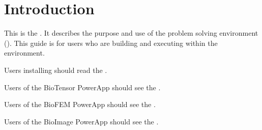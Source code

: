 %
% 
% 
% 
% 
% 
%


%

\chapter{Introduction}
\label{ch:intro}

This is the \etitle{\srug}.  It describes the purpose and use of the
\sr{} problem solving environment (\pse).  This guide is for users who
are building and executing  within the \sr{}
environment.

Users installing \sr{} should read the
.

Users of the BioTensor PowerApp should see the
.

Users of the BioFEM PowerApp should see the
.

Users of the BioImage PowerApp should see the
.

